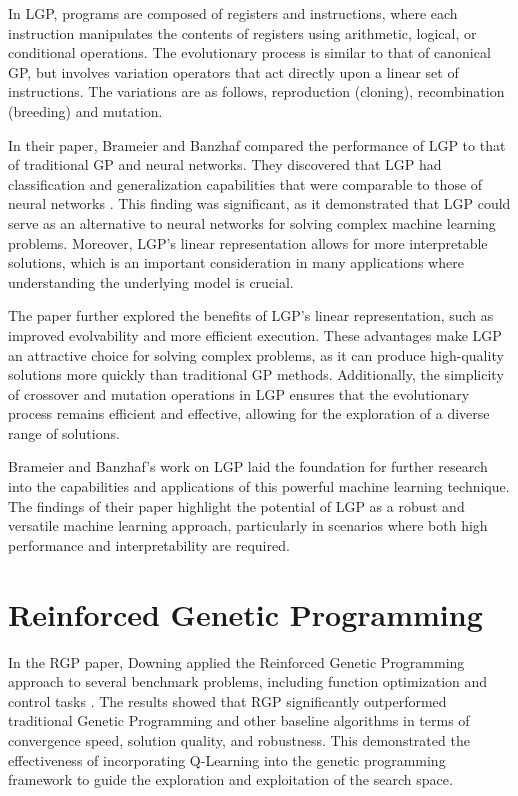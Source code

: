 \documentclass[12pt, final]{dalcsthesis}
\begin{document}
In LGP, programs are composed of registers and instructions, where each instruction manipulates the contents of registers using arithmetic, logical, or conditional operations. The evolutionary process is similar to that of canonical GP, but involves variation operators that act directly upon a linear set of instructions. The variations are as follows, reproduction (cloning), recombination (breeding) and mutation.

In their paper, Brameier and Banzhaf compared the performance of LGP to that of traditional GP and neural networks. They discovered that LGP had classification and generalization capabilities that were comparable to those of neural networks \cite{brameier2001comparison}. This finding was significant, as it demonstrated that LGP could serve as an alternative to neural networks for solving complex machine learning problems. Moreover, LGP's linear representation allows for more interpretable solutions, which is an important consideration in many applications where understanding the underlying model is crucial.

The paper further explored the benefits of LGP's linear representation, such as improved evolvability and more efficient execution. These advantages make LGP an attractive choice for solving complex problems, as it can produce high-quality solutions more quickly than traditional GP methods. Additionally, the simplicity of crossover and mutation operations in LGP ensures that the evolutionary process remains efficient and effective, allowing for the exploration of a diverse range of solutions.

Brameier and Banzhaf's work on LGP laid the foundation for further research into the capabilities and applications of this powerful machine learning technique. The findings of their paper highlight the potential of LGP as a robust and versatile machine learning approach, particularly in scenarios where both high performance and interpretability are required.

\section{Reinforced Genetic Programming}
In the RGP paper, Downing applied the Reinforced Genetic Programming approach to several benchmark problems, including function optimization and control tasks \cite{downing1995reinforced}. The results showed that RGP significantly outperformed traditional Genetic Programming and other baseline algorithms in terms of convergence speed, solution quality, and robustness. This demonstrated the effectiveness of incorporating Q-Learning into the genetic programming framework to guide the exploration and exploitation of the search space.
\end{document}
